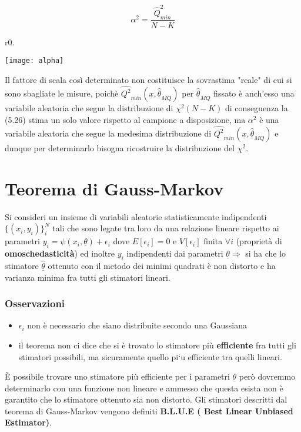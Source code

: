\documentclass[11pt,a4paper]{book}
\begin{document}
\begin{equation}
	\alpha^2 = \dfrac{\hat{Q}_{min}^{2}}{N-K}
\end{equation}

\begin{wrapfigure}{r}{0.\textwidth}
\centering

\texttt{[image: alpha]}	

\end{wrapfigure}

\noindent Il fattore di scala cos\`{i} determinato non costituisce la sovrastima "reale" di cui si sono sbagliate le misure, poich\`{e} $\hat{Q^2}_{min}(\underline{x},\underline{\hat{\theta}}_{MQ})$ per $\underline{\hat{\theta}}_{MQ}$ fissato \`{e} anch'esso una variabile aleatoria  che segue la distribuzione di $\chi^2(N-K)$ di conseguenza la (5.26) stima un solo valore rispetto al campione a disposizione, ma $\alpha^2$ \`{e} una variabile aleatoria che segue la medesima distribuzione di $\hat{Q^2}_{min}(\underline{x},\underline{\hat{\theta}}_{MQ})$ e dunque per determinarlo bisogna ricostruire la distribuzione del $\chi^2$.

\section{Teorema di Gauss-Markov}
Si consideri un insieme di variabili aleatorie statisticamente indipendenti $\{(x_i,y_i)\}_i^N$ tali che sono legate tra loro da una relazione lineare rispetto ai parametri $y_i = \psi(x_i ,\underline{\theta}) + \epsilon_i$ dove $E[\epsilon_i] = 0$ e $V[\epsilon_i] $ finita $\forall i$ (propriet\`{a} di \textbf{omoschedasticit\`{a}}) ed inoltre $y_i$ indipendenti dai parametri $\underline{\theta} \Rightarrow$ si ha che lo stimatore $\underline{\hat{\theta}}$ ottenuto con il metodo dei minimi quadrati \`{e} non distorto e ha varianza minima fra tutti gli stimatori lineari.

\subsubsection{Osservazioni}

\begin{itemize}
	\item $\epsilon_{i}$ non \`{e} necessario che siano distribuite secondo una Gaussiana
	\item il teorema non ci dice che si \`{e} trovato lo stimatore pi\`{u} \textbf{efficiente} fra tutti gli stimatori possibili, ma sicuramente quello pi`{u} efficiente tra quelli lineari.
\end{itemize}  
\`{E} possibile trovare uno stimatore pi\`{u} efficiente per i parametri $\underline{\theta}$ per\`{o} dovremmo determinarlo con una funzione non lineare e ammesso che questa esista non \`{e} garantito che lo stimatore ottenuto sia non distorto.\newline
Gli stimatori descritti dal teorema di Gauss-Markov vengono definiti \textbf{B.L.U.E ( Best Linear Unbiased Estimator)}. 
\end{document}
